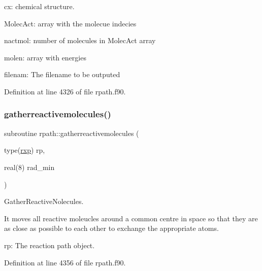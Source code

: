 \begin{DoxyItemize}
\item cx\+: chemical structure.
\item Molec\+Act\+: array with the molecue indecies
\item nactmol\+: number of molecules in Molec\+Act array
\item molen\+: array with energies
\item filenam\+: The filename to be outputed 
\end{DoxyItemize}

Definition at line 4326 of file rpath.\+f90.

\mbox{\label{namespacerpath_a9499e691ae9b7d354e0c84bb147b41ab}} 
\subsubsection{\texorpdfstring{gatherreactivemolecules()}{gatherreactivemolecules()}}
{\footnotesize\ttfamily subroutine rpath\+::gatherreactivemolecules (\begin{DoxyParamCaption}\item[{type(\mbox{\hyperlink{structrpath_1_1rxp}{rxp}})}]{rp,  }\item[{real(8)}]{rad\+\_\+min }\end{DoxyParamCaption})}



Gather\+Reactive\+Nolecules. 

It moves all reactive moleucles around a common centre in space so that they are as close as possible to each other to exchange the appropriate atoms.


\begin{DoxyItemize}
\item rp\+: The reaction path object. 
\end{DoxyItemize}

Definition at line 4356 of file rpath.\+f90.

\mbox{\label{namespacerpath_a259f0a538ae15f09680183f2a259da58}} 
